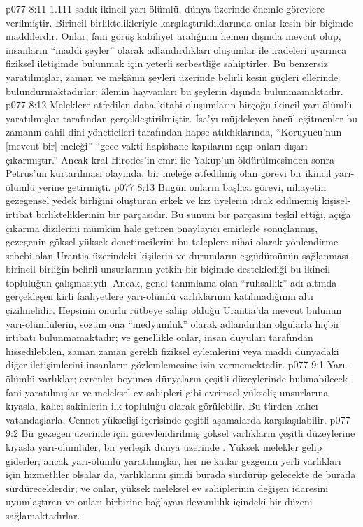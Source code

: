 \vs p077 8:11 1.111 sadık ikincil yarı\hyp{}ölümlü, dünya üzerinde önemle görevlere verilmiştir. Birincil birliktelikleriyle karşılaştırıldıklarında onlar kesin bir biçimde maddilerdir. Onlar, fani görüş kabiliyet aralığının hemen dışında mevcut olup, insanların “maddi şeyler” olarak adlandırdıkları oluşumlar ile iradeleri uyarınca fiziksel iletişimde bulunmak için yeterli serbestliğe sahiptirler. Bu benzersiz yaratılmışlar, zaman ve mekânın şeyleri üzerinde belirli kesin güçleri ellerinde bulundurmaktadırlar; âlemin hayvanları bu şeylerin dışında bulunmamaktadır.
\vs p077 8:12 Meleklere atfedilen daha kitabi oluşumların birçoğu ikincil yarı\hyp{}ölümlü yaratılmışlar tarafından gerçekleştirilmiştir. İsa’yı müjdeleyen öncül eğitmenler bu zamanın cahil dini yöneticileri tarafından hapse atıldıklarında, “Koruyucu’nun [mevcut bir] meleği” “gece vakti hapishane kapılarını açıp onları dışarı çıkarmıştır.” Ancak kral Hirodes’in emri ile Yakup’un öldürülmesinden sonra Petrus’un kurtarılması olayında, bir meleğe atfedilmiş olan görevi bir ikincil yarı\hyp{}ölümlü yerine getirmişti.
\vs p077 8:13 Bugün onların başlıca görevi, nihayetin gezegensel yedek birliğini oluşturan erkek ve kız üyelerin idrak edilmemiş kişisel\hyp{}irtibat birlikteliklerinin bir parçasıdır. Bu sunum bir parçasını teşkil ettiği, açığa çıkarma dizilerini mümkün hale getiren onaylayıcı emirlerle sonuçlanmış, gezegenin göksel yüksek denetimcilerini bu taleplere nihai olarak yönlendirme sebebi olan Urantia üzerindeki kişilerin ve durumların eşgüdümünün sağlanması, birincil birliğin belirli unsurlarının yetkin bir biçimde desteklediği bu ikincil topluluğun çalışmasıydı. Ancak, genel tanımlama olan “ruhsallık” adı altında gerçekleşen kirli faaliyetlere yarı\hyp{}ölümlü varlıklarının katılmadığının altı çizilmelidir. Hepsinin onurlu rütbeye sahip olduğu Urantia’da mevcut bulunun yarı\hyp{}ölümlülerin, sözüm ona “medyumluk” olarak adlandırılan olgularla hiçbir irtibatı bulunmamaktadır; ve genellikle onlar, insan duyuları tarafından hissedilebilen, zaman zaman gerekli fiziksel eylemlerini veya maddi dünyadaki diğer iletişimlerini insanların gözlemlemesine izin vermemektedir.
\vs p077 9:1 Yarı\hyp{}ölümlü varlıklar; evrenler boyunca dünyaların çeşitli düzeylerinde bulunabilecek fani yaratılmışlar ve meleksel ev sahipleri gibi evrimsel yükseliş unsurlarına kıyasla, kalıcı sakinlerin ilk topluluğu olarak görülebilir. Bu türden kalıcı vatandaşlarla, Cennet yükselişi içerisinde çeşitli aşamalarda karşılaşılabilir.
\vs p077 9:2 Bir gezegen üzerinde  için görevlendirilmiş göksel varlıkların çeşitli düzeylerine kıyasla yarı\hyp{}ölümlüler, bir yerleşik dünya üzerinde . Yüksek melekler gelip giderler; ancak yarı\hyp{}ölümlü yaratılmışlar, her ne kadar gezgenin yerli varlıkları için hizmetliler olsalar da, varlıklarını şimdi burada sürdürüp gelecekte de burada sürdüreceklerdir; ve onlar, yüksek meleksel ev sahiplerinin değişen idaresini uyumlaştıran ve onları birbirine bağlayan devamlılık içindeki bir düzeni sağlamaktadırlar.

